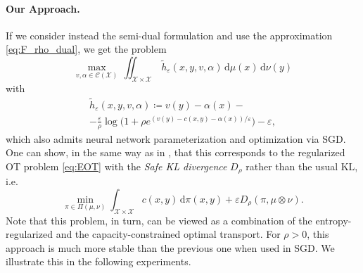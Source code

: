 \documentclass{article}
\newcommand{\dd}{\,\mathrm{d}}
\newcommand*{\eqset}{\coloneqq}
\def\cX{\mathcal{X}}
\theoremstyle{plain}
\theoremstyle{definition}
\theoremstyle{remark}
\begin{document}
\paragraph{Our Approach.}
If we consider instead the semi-dual formulation and use the approximation \eqref{eq:F_rho_dual}, we get the problem
\begin{equation}\label{eq:approx_eot}
    \max_{v,\alpha \in \mathcal{C}(\cX)} \,
    \iint_{ {\cX \times \cX}}\,  \tilde{h}_{\varepsilon}(x, y, v, \alpha) \dd\mu(x)\dd\nu(y)
\end{equation}
with
\begin{multline}\label{eq:h_tilde_eps}
    \tilde{h}_{\varepsilon}(x, y, v, \alpha) \eqset v(y) - \alpha(x)-\\
    - \frac{\varepsilon}{\rho} \log \bigl(1 + \rho e^{(v(y) - c(x,y) - \alpha(x)) / \varepsilon} \bigr) - \varepsilon ,
\end{multline}
which also admits neural network parameterization and optimization via SGD.
One can show, in the same way as in \citet{genevay2016stochastic}, that this corresponds to the regularized OT problem \eqref{eq:EOT} with the \textit{Safe KL divergence} $D_\rho$ rather than the usual KL, i.e.
\begin{equation*}
    \min_{\pi \in \Pi(\mu, \nu)} \int_{ {\cX \times \cX}} c(x, y) \dd \pi(x, y) + \varepsilon D_{\rho}(\pi, \mu \otimes \nu) .
\end{equation*}
Note that this problem, in turn, can be viewed as a combination of the entropy-regularized and the capacity-constrained optimal transport.
For \( \rho > 0 \), this approach is much more stable than the previous one when used in SGD. We illustrate this in the following experiments.
\end{document}
